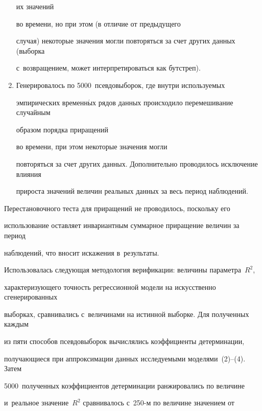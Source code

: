 \begin{multicols}{2}
\begin{enumerate}[1.]
 их значений %


 во времени, но при этом (в отличие от предыду\-ще\-го 


случая) некоторые значения могли повторяться за счет других данных (выборка 


с~возвращением, может интерпретироваться как \mbox{бутстреп}).\\[-8pt]


  \item Генерировалось по 5000~псевдовыборок, где внут\-ри используемых 


эмпирических вре\-мен\-н$\acute{\mbox{ы}}$х рядов данных происходило перемешивание случайным 


образом порядка приращений %


 во времени, при этом некоторые значения могли 


повторяться за счет других данных. Дополнительно проводилось исключение влияния 


прироста значений величин реальных \mbox{данных} за весь период наблюдений.


  \end{enumerate}


  


  Перестановочного теста для приращений не проводилось, поскольку его 


использование остав\-ля\-ет инвариантным суммарное приращение величин за период 


наблюдений, что вносит искажения в~результаты.


  


  Использовалась следующая методология верификации: величины параметра~$R^2$, 


характеризующего точность регрессионной модели на искусственно сгенерированных 


выборках, сравнивались с~величинами на истинной выборке. Для полученных каждым 


из пяти способов псевдовыборок вычислялись коэффициенты детерминации, 


получающиеся при аппроксимации данных ис\-сле\-ду\-емы\-ми моделями~(2)--(4). Затем 


5000~полученных коэффициентов детерминации ранжировались по величине 


и~реальное значение~$R^2$ сравнивалось с~250-м по величине значением от 



\end{multicols}
